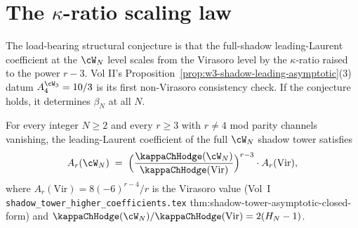 \section{The $\kappa$-ratio scaling law}
\label{sec:kappa-ratio-scaling-law}

The load-bearing structural conjecture is that the full-shadow leading-Laurent
coefficient at the $\cW_N$ level scales from the Virasoro level by the
$\kappa$-ratio raised to the power $r-3$. Vol II's
Proposition~\ref{prop:w3-shadow-leading-asymptotic}(3) datum
$A_4^{\cW_3} = 10/3$ is its first non-Virasoro consistency check. If
the conjecture holds, it determines $\beta_N$ at all $N$.

\begin{conjecture}
\label{conj:kappa-ratio-scaling-law}
\ClaimStatusConjectured
For every integer $N \ge 2$ and every $r \ge 3$ with $r \ne 4$ mod parity
channels vanishing, the leading-Laurent coefficient of the full
$\cW_N$ shadow tower satisfies
\begin{equation}
\label{eq:kappa-ratio-scaling}
A_r(\cW_N)
\;=\;
\Bigl( \frac{\kappaChHodge(\cW_N)}{\kappaChHodge(\mathrm{Vir})} \Bigr)^{r-3}
\cdot A_r(\mathrm{Vir}),
\end{equation}
where $A_r(\mathrm{Vir}) = 8(-6)^{r-4}/r$ is the Virasoro value
(Vol~I \texttt{shadow\_tower\_higher\_coefficients.tex}
thm:shadow-tower-asymptotic-closed-form) and
$\kappaChHodge(\cW_N)/\kappaChHodge(\mathrm{Vir}) = 2(H_N - 1)$.
\end{conjecture}

